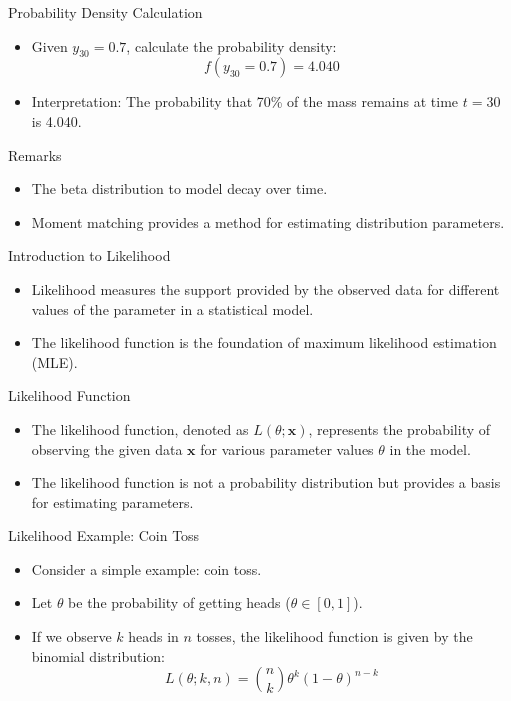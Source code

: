 \documentclass{beamer}
\begin{document}
\begin{frame}{Probability Density Calculation}
  \begin{itemize}
    \item Given \(y_{30} = 0.7\), calculate the probability density:
    \[ f(y_{30} = 0.7) = 4.040 \]
    \item Interpretation: The probability that 70\% of the mass remains at time \(t = 30\) is 4.040.
  \end{itemize}
\end{frame}

\begin{frame}{Remarks}
  \begin{itemize}
    \item The beta distribution to model decay over time.
    \item Moment matching provides a method for estimating distribution parameters.
  \end{itemize}
\end{frame}


\begin{frame}{Introduction to Likelihood}
  \begin{itemize}
    \item Likelihood  measures the support provided by the observed data for different values of the parameter in a statistical model.
    \item The likelihood function is the foundation of maximum likelihood estimation (MLE).
  \end{itemize}
\end{frame}

\begin{frame}{Likelihood Function}
  \begin{itemize}
    \item The likelihood function, denoted as \(L(\theta; \mathbf{x})\), represents the probability of observing the given data \(\mathbf{x}\) for various parameter values \(\theta\) in the model.
    \item The likelihood function is not a probability distribution but provides a basis for estimating parameters.
  \end{itemize}
\end{frame}

\begin{frame}{Likelihood Example: Coin Toss}
  \begin{itemize}
    \item Consider a simple example: coin toss.
    \item Let \(\theta\) be the probability of getting heads (\(\theta \in [0, 1]\)).
    \item If we observe \(k\) heads in \(n\) tosses, the likelihood function is given by the binomial distribution:
    \[ L(\theta; k, n) = \binom{n}{k} \theta^k (1 - \theta)^{n-k} \]
  \end{itemize}
\end{frame}
\end{document}
